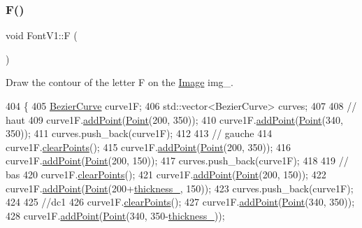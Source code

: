 \subsubsection{\texorpdfstring{F()}{F()}}
{\footnotesize\ttfamily void Font\+V1\+::F (\begin{DoxyParamCaption}{ }\end{DoxyParamCaption})}



Draw the contour of the letter F on the \mbox{\hyperlink{class_image}{Image}} img\+\_\+. 


\begin{DoxyCode}
404               \{
405     \mbox{\hyperlink{class_bezier_curve}{BezierCurve}} curve1F;
406     std::vector<BezierCurve> curves;
407 
408     \textcolor{comment}{// haut}
409     curve1F.\mbox{\hyperlink{class_bezier_curve_a38d16c18b36ae45619b05e26e226cf34}{addPoint}}(\mbox{\hyperlink{class_point}{Point}}(200, 350));
410     curve1F.\mbox{\hyperlink{class_bezier_curve_a38d16c18b36ae45619b05e26e226cf34}{addPoint}}(\mbox{\hyperlink{class_point}{Point}}(340, 350));
411     curves.push\_back(curve1F);
412 
413     \textcolor{comment}{// gauche}
414     curve1F.\mbox{\hyperlink{class_bezier_curve_a0ba8ce66d5af5971ae6a1b506029728e}{clearPoints}}();
415     curve1F.\mbox{\hyperlink{class_bezier_curve_a38d16c18b36ae45619b05e26e226cf34}{addPoint}}(\mbox{\hyperlink{class_point}{Point}}(200, 350));
416     curve1F.\mbox{\hyperlink{class_bezier_curve_a38d16c18b36ae45619b05e26e226cf34}{addPoint}}(\mbox{\hyperlink{class_point}{Point}}(200, 150));
417     curves.push\_back(curve1F);
418 
419     \textcolor{comment}{// bas}
420     curve1F.\mbox{\hyperlink{class_bezier_curve_a0ba8ce66d5af5971ae6a1b506029728e}{clearPoints}}();
421     curve1F.\mbox{\hyperlink{class_bezier_curve_a38d16c18b36ae45619b05e26e226cf34}{addPoint}}(\mbox{\hyperlink{class_point}{Point}}(200, 150));
422     curve1F.\mbox{\hyperlink{class_bezier_curve_a38d16c18b36ae45619b05e26e226cf34}{addPoint}}(\mbox{\hyperlink{class_point}{Point}}(200+\mbox{\hyperlink{class_font_v1_aed8040e76be9a52833627b92f0fb4e5f}{thickness\_}}, 150));
423     curves.push\_back(curve1F);
424 
425     \textcolor{comment}{//dc1}
426     curve1F.\mbox{\hyperlink{class_bezier_curve_a0ba8ce66d5af5971ae6a1b506029728e}{clearPoints}}();
427     curve1F.\mbox{\hyperlink{class_bezier_curve_a38d16c18b36ae45619b05e26e226cf34}{addPoint}}(\mbox{\hyperlink{class_point}{Point}}(340, 350));
428     curve1F.\mbox{\hyperlink{class_bezier_curve_a38d16c18b36ae45619b05e26e226cf34}{addPoint}}(\mbox{\hyperlink{class_point}{Point}}(340, 350-\mbox{\hyperlink{class_font_v1_aed8040e76be9a52833627b92f0fb4e5f}{thickness\_}}));

\end{DoxyCode}

